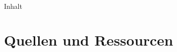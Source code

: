 

\maketitle
	\begin{frame}{Inhalt}
		\tableofcontents
	\end{frame}
	
	
	\section{Quellen und Ressourcen}
	\printbibliography

